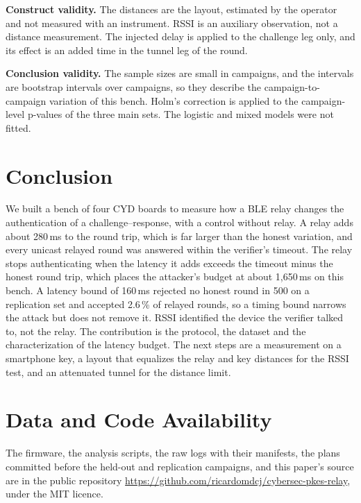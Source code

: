 \documentclass{ieeeaccess}
\begin{document}
\textbf{Construct validity.} The distances are the layout, estimated by the operator and not measured with an instrument. RSSI is an auxiliary observation, not a distance measurement. The injected delay is applied to the challenge leg only, and its effect is an added time in the tunnel leg of the round.

\textbf{Conclusion validity.} The sample sizes are small in campaigns, and the intervals are bootstrap intervals over campaigns, so they describe the campaign-to-campaign variation of this bench. Holm's correction is applied to the campaign-level p-values of the three main sets. The logistic and mixed models were not fitted.

\section{Conclusion}
\label{sec:conclusion}

We built a bench of four CYD boards to measure how a BLE relay changes the authentication of a challenge--response, with a control without relay. A relay adds about 280\,ms to the round trip, which is far larger than the honest variation, and every unicast relayed round was answered within the verifier's timeout. The relay stops authenticating when the latency it adds exceeds the timeout minus the honest round trip, which places the attacker's budget at about 1,650\,ms on this bench. A latency bound of 160\,ms rejected no honest round in 500 on a replication set and accepted 2.6\,\% of relayed rounds, so a timing bound narrows the attack but does not remove it. RSSI identified the device the verifier talked to, not the relay. The contribution is the protocol, the dataset and the characterization of the latency budget. The next steps are a measurement on a smartphone key, a layout that equalizes the relay and key distances for the RSSI test, and an attenuated tunnel for the distance limit.

\section*{Data and Code Availability}

The firmware, the analysis scripts, the raw logs with their manifests, the plans committed before the held-out and replication campaigns, and this paper's source are in the public repository \url{https://github.com/ricardomdcj/cybersec-pkes-relay}, under the MIT licence.
\end{document}

